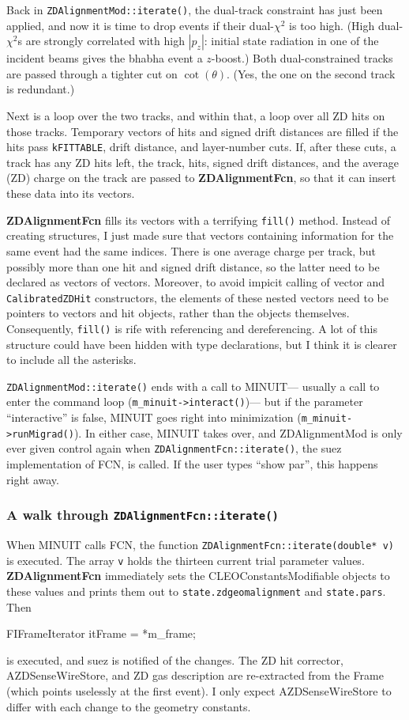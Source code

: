 \documentclass[12pt]{article}
\begin{document}
Back in {\tt ZDAlignmentMod::iterate()}, the dual-track constraint has
just been applied, and now it is time to drop events if their
dual-$\chi^2$ is too high.  (High dual-$\chi^2$s are strongly
correlated with high $|p_z|$: initial state radiation in one of the
incident beams gives the bhabha event a $z$-boost.)  Both
dual-constrained tracks are passed through a tighter cut on
$\cot(\theta)$.  (Yes, the one on the second track is redundant.)

Next is a loop over the two tracks, and within that, a loop over all
ZD hits on those tracks.  Temporary vectors of hits and signed drift
distances are filled if the hits pass {\tt kFITTABLE}, drift distance,
and layer-number cuts.  If, after these cuts, a track has any ZD hits
left, the track, hits, signed drift distances, and the average (ZD)
charge on the track are passed to {\bf ZDAlignmentFcn}, so that it can
insert these data into its vectors.

{\bf ZDAlignmentFcn} fills its vectors with a terrifying {\tt fill()}
method.  Instead of creating structures, I just made sure that vectors
containing information for the same event had the same indices.  There
is one average charge per track, but possibly more than one hit and
signed drift distance, so the latter need to be declared as vectors of
vectors.  Moreover, to avoid impicit calling of vector and
{\tt CalibratedZDHit} constructors, the elements of these nested
vectors need to be pointers to vectors and hit objects, rather than
the objects themselves.  Consequently, {\tt fill()} is rife with
referencing and dereferencing.  A lot of this structure could have
been hidden with type declarations, but I think it is clearer to
include all the asterisks.

{\tt ZDAlignmentMod::iterate()} ends with a call to MINUIT--- usually
a call to enter the command loop ({\tt m\_minuit->interact()})--- but
if the parameter ``interactive'' is false, MINUIT goes right into
minimization ({\tt m\_minuit->runMigrad()}).  In either case, MINUIT
takes over, and ZDAlignmentMod is only ever given control again when
{\tt ZDAlignmentFcn::iterate()}, the suez implementation of FCN, is
called.  If the user types ``show par'', this happens right away.

\subsubsection{A walk through {\tt ZDAlignmentFcn::iterate()}}

When MINUIT calls FCN, the function
{\tt ZDAlignmentFcn::iterate(double* v)} is executed.  The array
{\tt v} holds the thirteen current trial parameter values.
{\bf ZDAlignmentFcn} immediately sets the CLEOConstantsModifiable
objects to these values and prints them out to
{\tt state.zdgeomalignment} and {\tt state.pars}.  Then
\begin{center}
FIFrameIterator itFrame = *m\_frame;
\end{center}
is executed, and suez is notified of the changes.  The ZD hit
corrector, AZDSenseWireStore, and ZD gas description are re-extracted
from the Frame (which points uselessly at the first event).  I only
expect AZDSenseWireStore to differ with each change to the geometry
constants.
\end{document}
